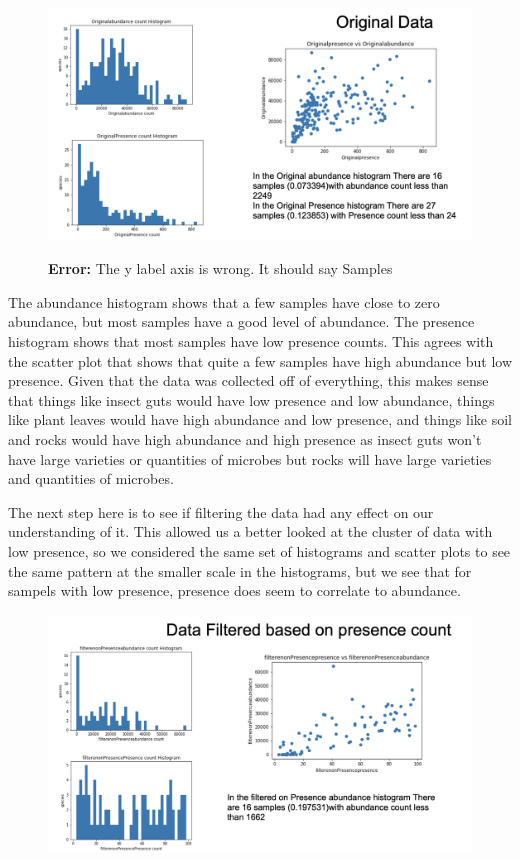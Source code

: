 \documentclass{article}
\theoremstyle{definition} \newtheorem*{lte}{Definition}
\theoremstyle{plain} \newtheorem*{csbt}{Theorem}
\begin{document}
\begin{figure}[H]
\begin{center}
  \includegraphics[width=.8\linewidth]{OriginalDataOverview.png}
  \label{fig:OgDataOverview}
  \caption{\textbf{ Error:} The y label axis is wrong. It should say Samples}
  \end{center}
\end{figure}



The abundance histogram shows that a few samples have close to zero abundance, but most samples have a good level of abundance. The presence histogram shows that most samples  have low presence counts. This agrees with the scatter plot that shows that quite a few samples have high abundance but low presence. Given that the data was collected off of everything, this makes sense that things like insect guts would have low presence and low abundance, things like plant leaves would have high abundance and low presence, and things like soil and rocks would have high abundance and high presence as insect guts won't have large varieties or quantities of microbes but rocks will have large varieties and quantities of microbes. 

The next step here is to see if filtering the data had any effect on our understanding of it. This allowed us a better looked at the cluster of data with low presence, so we considered the same set of histograms and scatter plots to see the same pattern at the smaller scale in the histograms, but we see that for sampels with low presence, presence does seem to correlate to abundance. 

\begin{figure}[H]
\begin{center}
  \includegraphics[width=.8\linewidth]{filtdataoverview.png}
  \label{fig:FiltDataOverview}
  \caption{}
  \end{center}
\end{figure}
\end{document}
